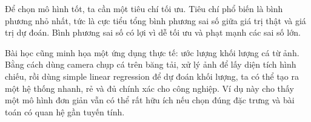 Để chọn mô hình tốt, ta cần một tiêu chí tối ưu. Tiêu chí phổ biến là bình phương nhỏ nhất, tức là cực tiểu tổng bình phương sai số giữa giá trị thật và giá trị dự đoán. Bình phương sai số có lợi vì dễ tối ưu và phạt mạnh các sai số lớn.

Bài học cũng minh họa một ứng dụng thực tế: ước lượng khối lượng cá từ ảnh. Bằng cách dùng camera chụp cá trên băng tải, xử lý ảnh để lấy diện tích hình chiếu, rồi dùng simple linear regression để dự đoán khối lượng, ta có thể tạo ra một hệ thống nhanh, rẻ và đủ chính xác cho công nghiệp. Ví dụ này cho thấy một mô hình đơn giản vẫn có thể rất hữu ích nếu chọn đúng đặc trưng và bài toán có quan hệ gần tuyến tính.